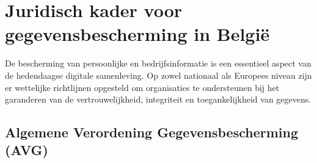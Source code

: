 






\section{Juridisch kader voor gegevensbescherming in België}%

De bescherming van persoonlijke en bedrijfsinformatie is een essentieel aspect van de hedendaagse digitale samenleving. 
Op zowel nationaal als Europees niveau zijn er wettelijke richtlijnen opgesteld om organisaties te ondersteunen bij het garanderen van de vertrouwelijkheid, 
integriteit en toegankelijkheid van gegevens.

\subsection{Algemene Verordening Gegevens\-besch\-erming (AVG)}%

